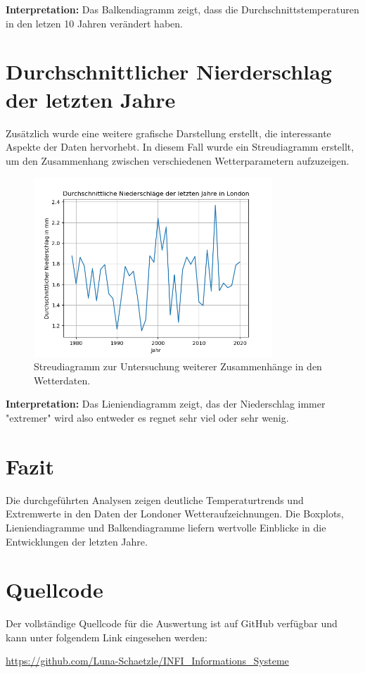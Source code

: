 \documentclass{article}
\begin{document}
\textbf{Interpretation:} Das Balkendiagramm zeigt, dass die Durchschnittstemperaturen in den letzen 10 Jahren verändert haben.

\newpage

\section{Durchschnittlicher Nierderschlag der letzten Jahre}
Zusätzlich wurde eine weitere grafische Darstellung erstellt, die interessante Aspekte der Daten hervorhebt. 
In diesem Fall wurde ein Streudiagramm erstellt, um den Zusammenhang zwischen verschiedenen Wetterparametern aufzuzeigen.

\begin{figure}[h!]
    \centering
    \includegraphics[width=0.8\textwidth]{A_1_5.png}
    \caption{Streudiagramm zur Untersuchung weiterer Zusammenhänge in den Wetterdaten.}
\end{figure}
\textbf{Interpretation:} Das Lieniendiagramm zeigt, das der Niederschlag immer "extremer" wird also entweder es regnet sehr viel oder sehr wenig.

\newpage

\section{Fazit}
Die durchgeführten Analysen zeigen deutliche Temperaturtrends und Extremwerte in den Daten der Londoner Wetteraufzeichnungen. 
Die Boxplots, Lieniendiagramme und Balkendiagramme liefern wertvolle Einblicke in die Entwicklungen der letzten Jahre.

\section{Quellcode}
Der vollständige Quellcode für die Auswertung ist auf GitHub verfügbar und kann unter folgendem Link eingesehen werden:

\url{https://github.com/Luna-Schaetzle/INFI_Informations_Systeme}
\end{document}
